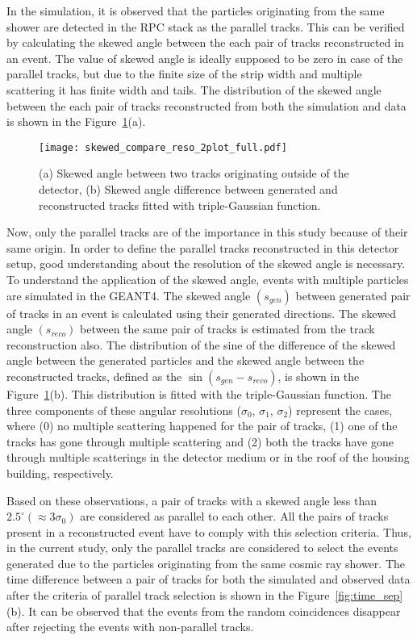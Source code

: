 In the simulation, it is observed that the particles originating
from the same shower are detected in the RPC stack as the parallel
tracks. This can be verified by calculating the skewed angle between
the each pair of tracks reconstructed in an event. The value of
skewed angle is ideally supposed to be zero in case of the parallel
tracks, but due to the finite size of the strip width and multiple
scattering it has finite width and tails. The distribution of the
skewed angle between the each pair of tracks reconstructed from
both the simulation and data is shown in the
Figure~\ref{fig:skewed_angle}(a).
\begin{figure}[h]
  \texttt{[image: skewed\_compare\_reso\_2plot\_full.pdf]}
  \caption{(a) Skewed angle between two tracks originating
    outside of the detector, (b) Skewed angle difference
    between generated and reconstructed tracks fitted with
    triple-Gaussian function.}
  \label{fig:skewed_angle}
\end{figure}
Now, only the parallel tracks are of the importance in this study
because of their same origin. In order to define the parallel tracks
reconstructed in this detector setup, good understanding about the
resolution of the skewed angle is necessary. To understand the
application of the skewed angle, events with multiple particles are
simulated in the GEANT4. The skewed angle $\left(s_{gen}\right)$
between generated pair of tracks in an event is calculated using
their generated directions. The skewed angle $\left(s_{reco}\right)$
between the same pair of tracks is estimated from the track
reconstruction also. The distribution of the sine of the difference
of the skewed angle between the generated particles and the skewed
angle between the reconstructed tracks, defined as the
$\sin\left(s_{gen}-s_{reco}\right)$, is shown in the
Figure~\ref{fig:skewed_angle}(b). This distribution is fitted with
the triple-Gaussian function. The three components of these angular
resolutions ($\sigma_{0}$, $\sigma_{1}$, $\sigma_{2}$) represent the
cases, where (0) no multiple scattering happened for the pair of
tracks, (1) one of the tracks has gone through multiple scattering and
(2) both the tracks have gone through multiple scatterings in the
detector medium or in the roof of the housing building, respectively.

Based on these observations, a pair of tracks with a skewed angle less
than $2.5^{\circ} \left(\approx 3\sigma_{0}\right)$ are considered as
parallel to each other. All the pairs of tracks present in a
reconstructed event have to comply with this selection criteria.
Thus, in the current study, only the parallel tracks are considered
to select the events generated due to the particles originating from
the same cosmic ray shower. The time difference between a pair of
tracks for both the simulated and observed data after the criteria of
parallel track selection is shown in the Figure~\ref{fig:time_sep}(b).
It can be observed that the events from the random coincidences
disappear after rejecting the events with non-parallel tracks.

